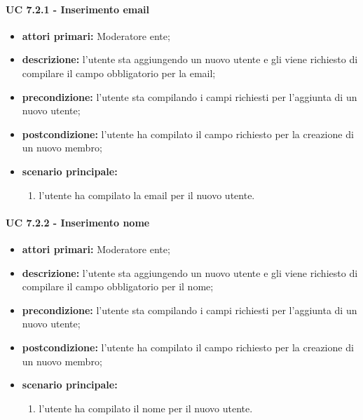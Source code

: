 			\paragraph{UC 7.2.1 - Inserimento email}
			\begin{itemize}
				\item \textbf{attori primari:} Moderatore ente;
				\item \textbf{descrizione:} l'utente sta aggiungendo un nuovo utente e gli viene richiesto di compilare il campo obbligatorio per la email;
				\item \textbf{precondizione:} l'utente sta compilando i campi richiesti per l'aggiunta di un nuovo utente;
				\item \textbf{postcondizione:} l'utente ha compilato il campo richiesto per la creazione di un nuovo membro;
				\item \textbf{scenario principale:}
				\begin{enumerate}
					\item{l'utente ha compilato la email per il nuovo utente.}
				\end{enumerate}	
			\end{itemize}

			\paragraph{UC 7.2.2 - Inserimento nome}
			\begin{itemize}
				\item \textbf{attori primari:} Moderatore ente;
				\item \textbf{descrizione:} l'utente sta aggiungendo un nuovo utente e gli viene richiesto di compilare il campo obbligatorio per il nome;
				\item \textbf{precondizione:} l'utente sta compilando i campi richiesti per l'aggiunta di un nuovo utente;
				\item \textbf{postcondizione:} l'utente ha compilato il campo richiesto per la creazione di un nuovo membro;
				\item \textbf{scenario principale:}
				\begin{enumerate}
					\item{l'utente ha compilato il nome per il nuovo utente.}
				\end{enumerate}	
			\end{itemize}

